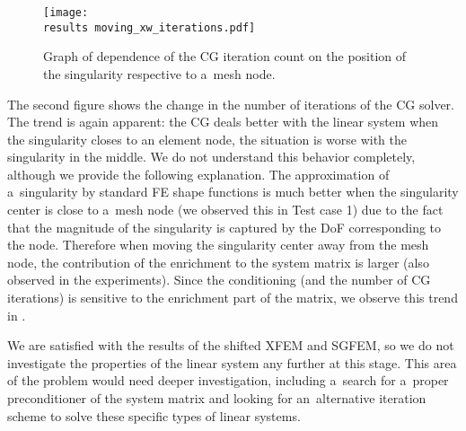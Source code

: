 \begin{figure}[!htb]
  \centering    
    \texttt{[image: \\results moving\_xw\_iterations.pdf]}
  \caption[CG iteration count dependence on singularity position]{Graph of dependence of the CG iteration count
   on the position of the singularity respective to a~mesh node.}
  \label{fig:moving_xw_iterations}
\end{figure}
%
The second figure shows the change in the number of iterations of the CG solver. The trend is again apparent:
the CG deals better with the linear system when the singularity closes to an element node, the situation is worse
with the singularity in the middle. We do not understand this behavior completely, although we provide the following explanation.
The approximation of a~singularity by standard FE shape functions is much better when the singularity center is close to a~mesh node
(we observed this in Test case 1) due to the fact that the magnitude of the singularity is captured by the DoF corresponding to the node. 
Therefore when moving the singularity center away from the mesh node, the contribution of the enrichment to the system matrix is larger
(also observed in the experiments).
Since the conditioning (and the number of CG iterations) is sensitive to the enrichment part of the matrix,
we observe this trend in .


%         
%

We are satisfied with the results of the shifted XFEM and SGFEM, so we do not investigate the properties of the linear
system any further at this stage. This area of the problem would need deeper investigation, including a~search for a~proper
preconditioner of the system matrix and looking for an~alternative iteration scheme to solve these specific types of linear systems.




